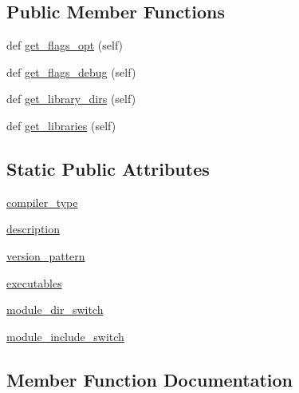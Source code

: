 \subsection*{Public Member Functions}
\begin{DoxyCompactItemize}
\item 
def \hyperlink{classnumpy_1_1distutils_1_1fcompiler_1_1lahey_1_1LaheyFCompiler_a1a844f764644ba8b17455ec8de42a5cf}{get\+\_\+flags\+\_\+opt} (self)
\item 
def \hyperlink{classnumpy_1_1distutils_1_1fcompiler_1_1lahey_1_1LaheyFCompiler_a18099924c9cba59638e676c450c7f802}{get\+\_\+flags\+\_\+debug} (self)
\item 
def \hyperlink{classnumpy_1_1distutils_1_1fcompiler_1_1lahey_1_1LaheyFCompiler_afcc6c6be293cc5d72dd63868749ade73}{get\+\_\+library\+\_\+dirs} (self)
\item 
def \hyperlink{classnumpy_1_1distutils_1_1fcompiler_1_1lahey_1_1LaheyFCompiler_ab7ef392f79a887ad61cc8d9d416fbf11}{get\+\_\+libraries} (self)
\end{DoxyCompactItemize}
\subsection*{Static Public Attributes}
\begin{DoxyCompactItemize}
\item 
\hyperlink{classnumpy_1_1distutils_1_1fcompiler_1_1lahey_1_1LaheyFCompiler_ae96a279988d3c14caad628fdc3c84288}{compiler\+\_\+type}
\item 
\hyperlink{classnumpy_1_1distutils_1_1fcompiler_1_1lahey_1_1LaheyFCompiler_a24ab4e74c178042b5c3fe95f1f035434}{description}
\item 
\hyperlink{classnumpy_1_1distutils_1_1fcompiler_1_1lahey_1_1LaheyFCompiler_a9f63d6a3ea269475737c2104a61a15fb}{version\+\_\+pattern}
\item 
\hyperlink{classnumpy_1_1distutils_1_1fcompiler_1_1lahey_1_1LaheyFCompiler_a43b8c70ec5f5849ccf8259bec54d1de5}{executables}
\item 
\hyperlink{classnumpy_1_1distutils_1_1fcompiler_1_1lahey_1_1LaheyFCompiler_acc8a9a416fb11ce7310ac3cbad1dfb10}{module\+\_\+dir\+\_\+switch}
\item 
\hyperlink{classnumpy_1_1distutils_1_1fcompiler_1_1lahey_1_1LaheyFCompiler_a0776b2d3038c201e103738d64766dfec}{module\+\_\+include\+\_\+switch}
\end{DoxyCompactItemize}


\subsection{Member Function Documentation}
\mbox{\label{classnumpy_1_1distutils_1_1fcompiler_1_1lahey_1_1LaheyFCompiler_a18099924c9cba59638e676c450c7f802}} 
